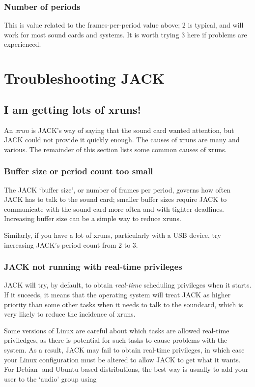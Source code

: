 \documentclass[10pt,a4paper]{book}
\begin{document}
\subsubsection{Number of periods}

This is value related to the frames-per-period value above; 2 is
typical, and will work for most sound cards and systems.  It is worth
trying 3 here if problems are experienced.


\section{Troubleshooting JACK}

\subsection{I am getting lots of xruns!}

An \emph{xrun} is JACK's way of saying that the sound card wanted
attention, but JACK could not provide it quickly enough.  The causes
of xruns are many and various.  The remainder of this section lists
some common causes of xruns.


\subsubsection{Buffer size or period count too small}

The JACK `buffer size', or number of frames per period, governs how
often JACK has to talk to the sound card; smaller buffer sizes require
JACK to communicate with the sound card more often and with tighter
deadlines.  Increasing buffer size can be a simple way to reduce
xruns.

Similarly, if you have a lot of xruns, particularly with a USB device,
try increasing JACK's period count from 2 to 3.


\subsubsection{JACK not running with real-time privileges}

JACK will try, by default, to obtain \emph{real-time} scheduling
privileges when it starts.  If it suceeds, it means that the
operating system will treat JACK as higher priority than some other
tasks when it needs to talk to the soundcard, which is very likely to
reduce the incidence of xruns.

Some versions of Linux are careful about which tasks are allowed
real-time priviledges, as there is potential for such tasks to cause
problems with the system.  As a result, JACK may fail to obtain
real-time privileges, in which case your Linux configuration must be
altered to allow JACK to get what it wants.  For Debian- and
Ubuntu-based distributions, the best way is usually to add your user
to the `audio' group using
\end{document}
